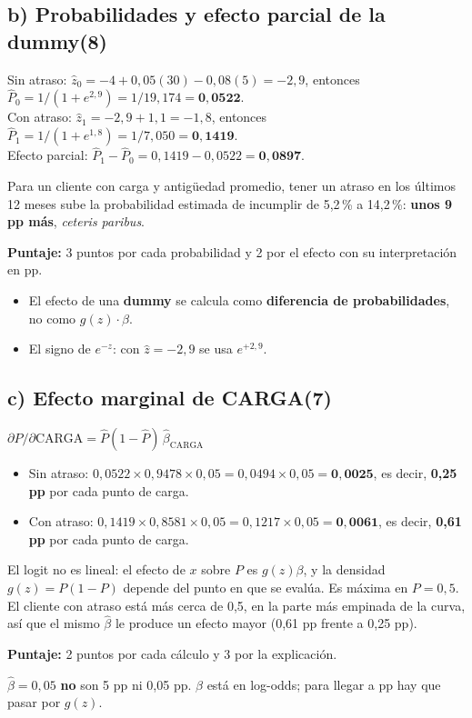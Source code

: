 \documentclass[11pt,a4paper]{article}
\newcommand{\sub}[2]{\subsection*{#1\hfill{\normalsize\textbf{(#2)}}}}
\begin{document}
\sub{b) Probabilidades y efecto parcial de la dummy}{8}
Sin atraso: $\hat z_0=-4+0{,}05(30)-0{,}08(5)=-2{,}9$, entonces $\hat P_0=1/(1+e^{2{,}9})=1/19{,}174=\mathbf{0{,}0522}$.\\
Con atraso: $\hat z_1=-2{,}9+1{,}1=-1{,}8$, entonces $\hat P_1=1/(1+e^{1{,}8})=1/7{,}050=\mathbf{0{,}1419}$.\\
Efecto parcial: $\hat P_1-\hat P_0=0{,}1419-0{,}0522=\mathbf{0{,}0897}$.
\begin{ejemplar}
Para un cliente con carga y antigüedad promedio, tener un atraso en los últimos 12 meses sube la probabilidad estimada de incumplir de 5,2\,\% a 14,2\,\%: \textbf{unos 9 pp más}, \emph{ceteris paribus}.
\end{ejemplar}
\textbf{Puntaje:} 3 puntos por cada probabilidad y 2 por el efecto con su interpretación en pp.
\begin{trampa}
\begin{itemize}[leftmargin=*,itemsep=0pt,topsep=0pt]
\item El efecto de una \textbf{dummy} se calcula como \textbf{diferencia de probabilidades}, no como $g(z)\cdot\beta$.
\item El signo de $e^{-z}$: con $\hat z=-2{,}9$ se usa $e^{+2{,}9}$.
\end{itemize}
\end{trampa}

\sub{c) Efecto marginal de CARGA}{7}
$\partial P/\partial\text{CARGA}=\hat P(1-\hat P)\,\hat\beta_{\text{CARGA}}$
\begin{itemize}[leftmargin=*,itemsep=1pt]
\item Sin atraso: $0{,}0522\times0{,}9478\times0{,}05=0{,}0494\times0{,}05=\mathbf{0{,}0025}$, es decir, \textbf{0,25 pp} por cada punto de carga.
\item Con atraso: $0{,}1419\times0{,}8581\times0{,}05=0{,}1217\times0{,}05=\mathbf{0{,}0061}$, es decir, \textbf{0,61 pp} por cada punto de carga.
\end{itemize}
\begin{ejemplar}
El logit no es lineal: el efecto de $x$ sobre $P$ es $g(z)\beta$, y la densidad $g(z)=P(1-P)$ depende del punto en que se evalúa. Es máxima en $P=0{,}5$. El cliente con atraso está más cerca de 0,5, en la parte más empinada de la curva, así que el mismo $\hat\beta$ le produce un efecto mayor (0,61 pp frente a 0,25 pp).
\end{ejemplar}
\textbf{Puntaje:} 2 puntos por cada cálculo y 3 por la explicación.
\begin{trampa}
$\hat\beta=0{,}05$ \textbf{no} son 5 pp ni 0,05 pp. $\hat\beta$ está en log-odds; para llegar a pp hay que pasar por $g(z)$.
\end{trampa}
\end{document}
